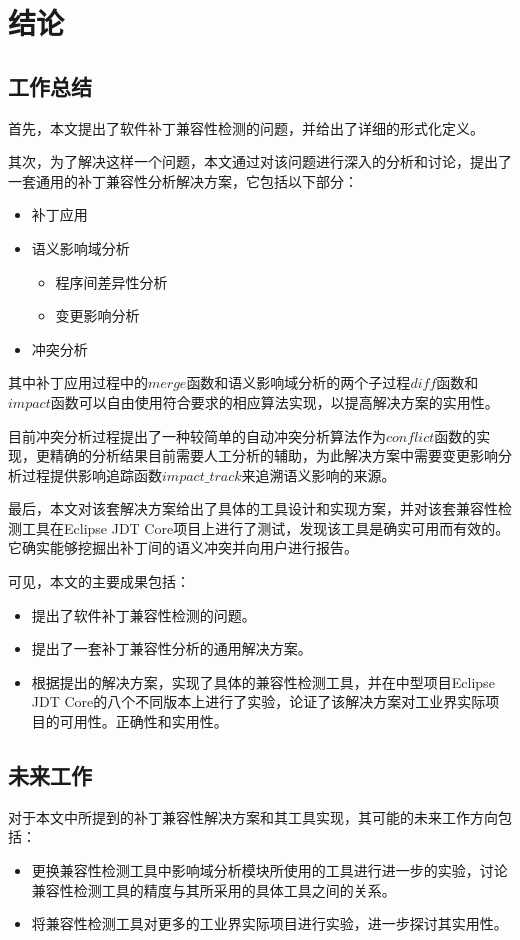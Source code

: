 \chapter{结论}
\section{工作总结}

首先，本文提出了软件补丁兼容性检测的问题，并给出了详细的形式化定义。

其次，为了解决这样一个问题，本文通过对该问题进行深入的分析和讨论，提出了一套通用的补丁兼容性分析解决方案，它包括以下部分：
\begin{itemize}
	\item 补丁应用
	\item 语义影响域分析
	\begin{itemize}
		\item 程序间差异性分析
		\item 变更影响分析
	\end{itemize}
	\item 冲突分析
\end{itemize}

其中补丁应用过程中的$merge$函数和语义影响域分析的两个子过程$diff$函数和$impact$函数可以自由使用符合要求的相应算法实现，以提高解决方案的实用性。

目前冲突分析过程提出了一种较简单的自动冲突分析算法作为$conflict$函数的实现，更精确的分析结果目前需要人工分析的辅助，为此解决方案中需要变更影响分析过程提供影响追踪函数$impact\_track$来追溯语义影响的来源。

最后，本文对该套解决方案给出了具体的工具设计和实现方案，并对该套兼容性检测工具在Eclipse JDT Core项目上进行了测试，发现该工具是确实可用而有效的。它确实能够挖掘出补丁间的语义冲突并向用户进行报告。

可见，本文的主要成果包括：
\begin{itemize}
	\item 提出了软件补丁兼容性检测的问题。
	\item 提出了一套补丁兼容性分析的通用解决方案。
	\item 根据提出的解决方案，实现了具体的兼容性检测工具，并在中型项目Eclipse JDT Core的八个不同版本上进行了实验，论证了该解决方案对工业界实际项目的可用性。正确性和实用性。
\end{itemize}

\section{未来工作}

对于本文中所提到的补丁兼容性解决方案和其工具实现，其可能的未来工作方向包括：
\begin{itemize}
	\item 更换兼容性检测工具中影响域分析模块所使用的工具进行进一步的实验，讨论兼容性检测工具的精度与其所采用的具体工具之间的关系。
	\item 将兼容性检测工具对更多的工业界实际项目进行实验，进一步探讨其实用性。
\end{itemize}
